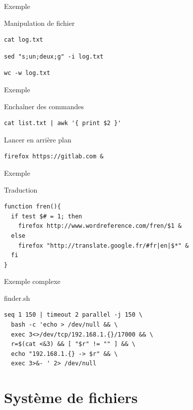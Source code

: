 \documentclass{beamer}
\begin{document}
\begin{frame}[fragile]{Exemple}
\begin{block}{Manipulation de fichier}
\begin{verbatim}
cat log.txt
\end{verbatim}
\begin{verbatim}
sed "s;un;deux;g" -i log.txt
\end{verbatim}
\begin{verbatim}
wc -w log.txt
\end{verbatim}
\end{block}
\end{frame}

\begin{frame}[fragile]{Exemple}
\begin{block}{Enchaîner des commandes}
\begin{verbatim}
cat list.txt | awk '{ print $2 }'
\end{verbatim}
\end{block}
\begin{block}{Lancer en arrière plan}
\begin{verbatim}
firefox https://gitlab.com &
\end{verbatim}
\end{block}
\end{frame}

\begin{frame}[fragile]{Exemple}
\begin{block}{Traduction}
\begin{verbatim}
function fren(){
  if test $# = 1; then
    firefox http://www.wordreference.com/fren/$1 &
  else
    firefox "http://translate.google.fr/#fr|en|$*" &
  fi
}
\end{verbatim}
\end{block}
\end{frame}

\begin{frame}[fragile]{Exemple complexe}
\begin{block}{finder.sh}
\begin{verbatim}
seq 1 150 | timeout 2 parallel -j 150 \
  bash -c 'echo > /dev/null && \
  exec 3<>/dev/tcp/192.168.1.{}/17000 && \
  r=$(cat <&3) && [ "$r" != "" ] && \
  echo "192.168.1.{} -> $r" && \
  exec 3>&- ' 2> /dev/null
\end{verbatim}
\end{block}
\end{frame}


\section{Système de fichiers}
\end{document}
